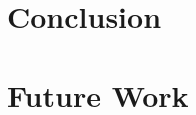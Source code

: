 \documentclass[12pt]{drexelthesis}
\begin{document}
\chapter{Conclusion}
\label{chap:conclusion}


\chapter{Future Work}
\label{chap:future}







\pagebreak
{}
\begin{spacing}{1.0}


\end{spacing}

\newpage
\thispagestyle{empty}

                                                                                                
\end{document}
